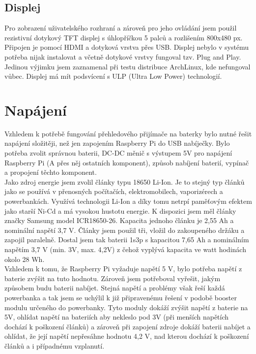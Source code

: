 \documentclass{ctuthesis}
\begin{document}
\subsection{Displej}
Pro zobrazení uživatelského rozhraní a zároveň pro jeho ovládání jsem použil rezistivní dotykový TFT displej s úhlopříčkou 5 palců a rozlišením 800x480 px. Připojen je pomocí HDMI a dotyková vrstva přes USB. Displej nebylo v systému potřeba nijak instalovat a včetně dotykové vrstvy fungoval tzv. Plug and Play. Jedinou výjimku jsem zaznamenal při testu distribuce ArchLinux, kde nefungoval vůbec. Displej má mít podsvícení s ULP (Ultra Low Power) technologií.


\section{Napájení} \label{power}
Vzhledem k potřebě fungování přehledového přijímače na baterky bylo nutné řešit napájení složitěji, než jen zapojením Raspberry Pi do USB nabíječky. Bylo potřeba zvolit správnou baterii, DC-DC měnič s výstupem 5V pro napájení Raspberry Pi (A přes něj ostatních komponent), způsob nabíjení baterií, vypínač a propojení těchto komponent.\\
 Jako zdroj energie jsem zvolil články typu 18650 Li-Ion. Je to stejný typ článků jako se používá v přenosných počítačích, elektromobilech, vaporizérech a powerbankách. Využívá technologii Li-Ion a díky tomu netrpí paměťovým efektem jako starší Ni-Cd a má vysokou hustotu energie. K dispozici jsem měl články značky Samsung model ICR18650-26. Kapacita jednoho článku je 2,55 Ah a nominální napětí 3,7 V. Články jsem použil tři, vložil do zakoupeného držáku a zapojil paralelně. Dostal jsem tak baterii 1s3p s kapacitou 7,65 Ah a nominálním napětím 3,7 V (min. 3V, max. 4,2V) z čehož vyplývá kapacita ve watt hodinách okolo 28 Wh.\\
 Vzhledem k tomu, že Raspberry Pi vyžaduje napětí 5 V, bylo potřeba napětí z baterie zvýšit na tuto hodnotu. Zároveň jsem potřeboval vyřešit, jakým způsobem budu baterii nabíjet. Stejná napětí a problémy však řeší každá powerbanka a tak jsem se uchýlil k již připravenému řešení v podobě booster modulu určeného do powerbanky. Tyto moduly dokáží zvýšit napětí z baterie na 5V, ohlídat napětí na bateriích aby nekleslo pod 3V (při menších napětích dochází k poškození článků) a zároveň při zapojení zdroje dokáží baterii nabíjet a ohlídat, že její napětí nepřesáhne hodnotu 4,2 V, nad kterou dochází k poškození článků a i případnému vzplanutí.\\
\end{document}
